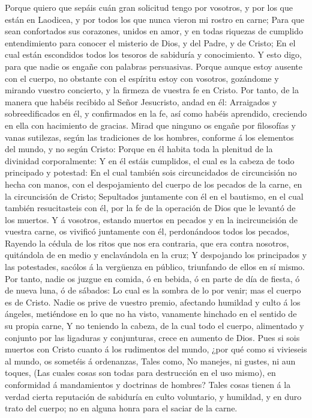  Porque quiero que sepáis cuán gran solicitud tengo por
vosotros, y por los que están en Laodicea, y por todos los que nunca
vieron mi rostro en carne;  Para que sean confortados sus
corazones, unidos en amor, y en todas riquezas de cumplido entendimiento
para conocer el misterio de Dios, y del Padre, y de Cristo;
 En el cual están escondidos todos los tesoros de
sabiduría y conocimiento.  Y esto digo, para que nadie os
engañe con palabras persuasivas.  Porque aunque estoy
ausente con el cuerpo, no obstante con el espíritu estoy con vosotros,
gozándome y mirando vuestro concierto, y la firmeza de vuestra fe en
Cristo.  Por tanto, de la manera que habéis recibido al
Señor Jesucristo, andad en él:  Arraigados y
sobreedificados en él, y confirmados en la fe, así como habéis
aprendido, creciendo en ella con hacimiento de gracias. 
Mirad que ninguno os engañe por filosofías y vanas sutilezas, según las
tradiciones de los hombres, conforme á los elementos del mundo, y no
según Cristo:  Porque en él habita toda la plenitud de la
divinidad corporalmente:  Y en él estáis cumplidos, el
cual es la cabeza de todo principado y potestad:  En el
cual también sois circuncidados de circuncisión no hecha con manos, con
el despojamiento del cuerpo de los pecados de la carne, en la
circuncisión de Cristo;  Sepultados juntamente con él en
el bautismo, en el cual también resucitasteis con él, por la fe de la
operación de Dios que le levantó de los muertos.  Y á
vosotros, estando muertos en pecados y en la incircuncisión de vuestra
carne, os vivificó juntamente con él, perdonándoos todos los pecados,
 Rayendo la cédula de los ritos que nos era contraria,
que era contra nosotros, quitándola de en medio y enclavándola en la
cruz;  Y despojando los principados y las potestades,
sacólos á la vergüenza en público, triunfando de ellos en sí mismo.
 Por tanto, nadie os juzgue en comida, ó en bebida, ó en
parte de día de fiesta, ó de nueva luna, ó de sábados: 
Lo cual es la sombra de lo por venir; mas el cuerpo es de Cristo.
 Nadie os prive de vuestro premio, afectando humildad y
culto á los ángeles, metiéndose en lo que no ha visto, vanamente
hinchado en el sentido de su propia carne,  Y no teniendo
la cabeza, de la cual todo el cuerpo, alimentado y conjunto por las
ligaduras y conjunturas, crece en aumento de Dios.  Pues
si sois muertos con Cristo cuanto á los rudimentos del mundo, ¿por qué
como si vivieseis al mundo, os sometéis á ordenanzas, 
Tales como, No manejes, ni gustes, ni aun toques,  (Las
cuales cosas son todas para destrucción en el uso mismo), en conformidad
á mandamientos y doctrinas de hombres?  Tales cosas
tienen á la verdad cierta reputación de sabiduría en culto voluntario, y
humildad, y en duro trato del cuerpo; no en alguna honra para el saciar
de la carne.

